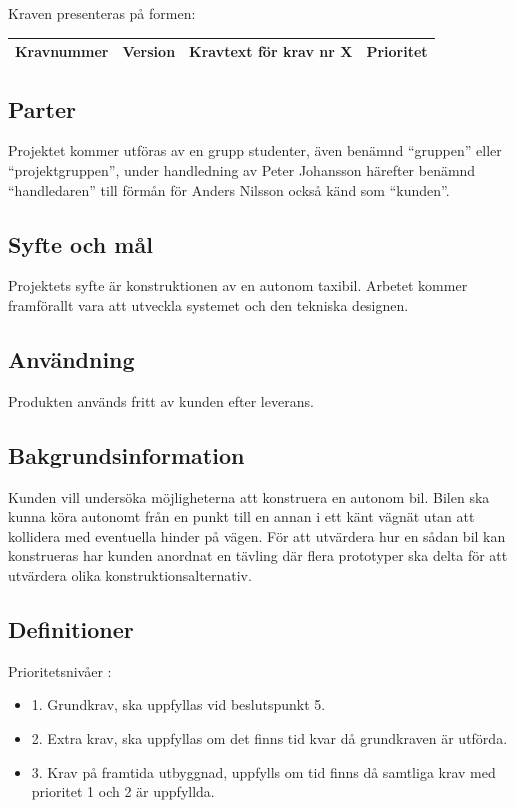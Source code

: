 \documentclass[10pt,oneside,swedish]{../lips}
\begin{document}
Kraven presenteras på formen:
\begin{longtable}{|c|p{17mm}|p{100mm}|c|}
  \hline
  Kravnummer & Version &  Kravtext för krav nr X & Prioritet\\
  \hline
\end{longtable}

\subsection{Parter}
Projektet kommer utföras av en grupp studenter, även benämnd “gruppen” eller “projektgruppen”, under handledning av Peter Johansson härefter benämnd “handledaren” till förmån för Anders Nilsson också känd som “kunden”.

\subsection{Syfte och mål}
Projektets syfte är konstruktionen av en autonom taxibil. Arbetet kommer framförallt vara att utveckla systemet och den tekniska designen. 

\subsection{Användning}
Produkten används fritt av kunden efter leverans.

\subsection{Bakgrundsinformation}
Kunden vill undersöka möjligheterna att konstruera en autonom bil. Bilen ska kunna köra autonomt från en punkt till en annan i ett känt vägnät utan att kollidera med eventuella hinder på vägen. 
För att utvärdera hur en sådan bil kan konstrueras har kunden anordnat en tävling där flera prototyper ska delta för att utvärdera olika konstruktionsalternativ.

\subsection{Definitioner}
Prioritetsnivåer \cite{lect3}:
\begin{itemize}
  \item 1. Grundkrav, ska uppfyllas vid beslutspunkt 5.
  \item 2. Extra krav, ska uppfyllas om det finns tid kvar då grundkraven är utförda.
  \item 3. Krav på framtida utbyggnad, uppfylls om tid finns då samtliga krav med prioritet 1 och 2 är uppfyllda.
\end{itemize}
\end{document}
